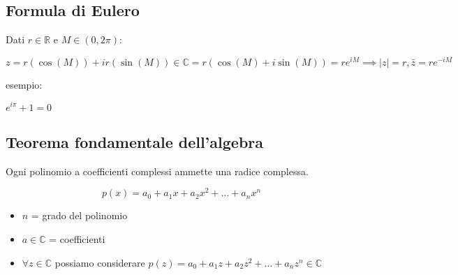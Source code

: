 \documentclass{subfiles}
\begin{document}
\subsection{Formula di Eulero}

Dati $r \in \mathbb{R}$ e $M \in (0, 2\pi)$:

$$
z = r(\cos(M)) + i r(\sin(M)) \in \mathbb{C} = r(\cos(M) + i\sin(M)) = re^{iM} \implies |z| = r, \bar{z} = re^{-iM}
$$

\noindent
esempio:

\begin{description}
    \item $e^{i\pi} + 1 = 0$
\end{description}

\subsection{Teorema fondamentale dell'algebra}

Ogni polinomio a coefficienti complessi ammette una radice complessa.

$$
p(x) = a_0 + a_1 x + a_2 x^2 + \dots + a_n x^n
$$

\begin{itemize}
    \item $n$ = grado del polinomio
    \item $a \in \mathbb{C}$ = coefficienti
    \item $\forall z \in \mathbb{C}$ possiamo considerare $p(z) = a_0 + a_1 z + a_2 z^2 + \dots + a_n z^n \in \mathbb{C}$
\end{itemize}
\end{document}
